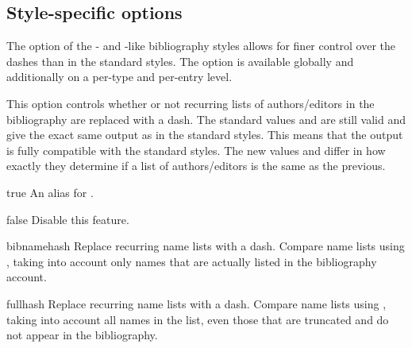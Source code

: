 \documentclass[DIV=9]{scrartcl}
\begin{document}
\subsection{Style-specific options}\label{sec:opt:style}
\begin{optionlist}

The  option of the - and
-like bibliography styles allows for
finer control over the dashes than in the standard styles.
The option is available globally and additionally on a per-type and per-entry
level.

This option controls whether or not recurring lists of authors/editors in the
bibliography are replaced with a dash.
The standard values  and  are still valid and give
the exact same output as in the standard styles.
This means that the output is fully compatible with the standard styles.
The new values  and  differ in how exactly
they determine if a list of authors/editors is the same as the previous.
\begin{valuelist}
\item[true] An alias for .
\item[false] Disable this feature.
\item[bibnamehash] Replace recurring name lists with a dash.
                   Compare name lists using , taking
                   into account only names that are actually listed in the
                   bibliography account.
\item[fullhash] Replace recurring name lists with a dash.
                Compare name lists using , taking into
                account all names in the list, even those that are truncated
                and do not appear in the bibliography.
\end{valuelist}



\end{optionlist}
\end{document}

